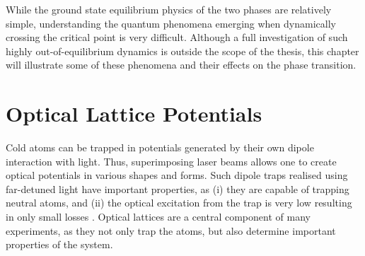 While the ground state equilibrium physics of the two phases are relatively simple, understanding the quantum phenomena emerging when dynamically crossing the critical point is very difficult. Although a full investigation of such highly out-of-equilibrium dynamics is outside the scope of the thesis, this chapter will illustrate some of these phenomena and their effects on the phase transition.  




\section{Optical Lattice Potentials}
Cold atoms can be trapped in potentials generated by their own dipole interaction with light. Thus, superimposing laser beams allows one to create optical potentials in various shapes and forms. Such dipole traps realised using far-detuned light have important properties, as (i) they are capable of trapping neutral atoms, and (ii) the optical excitation from the trap is very low resulting in only small losses \cite{grimm}. Optical lattices are a central component of many experiments, as they not only trap the atoms, but also determine important properties of the system.

